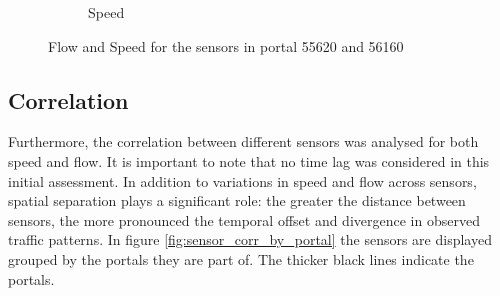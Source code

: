 \begin{figure}[H]
\begin{subfigure}{0.49 \linewidth}
			\caption{Speed}
		\end{subfigure}
		\caption{Flow and Speed for the sensors in portal 55620 and 56160 }
		\label{fig:speed_and_flow_sensors}
	\end{figure}
	
	
	\subsection{Correlation}
	Furthermore, the correlation between different sensors was analysed for both speed and flow. It is important to note that no time lag was considered in this initial assessment. In addition to variations in speed and flow across sensors, spatial separation plays a significant role: the greater the distance between sensors, the more pronounced the temporal offset and divergence in observed traffic patterns. In figure \ref{fig:sensor_corr_by_portal} the sensors are displayed grouped by the portals they are part of. The thicker black lines indicate the portals.
